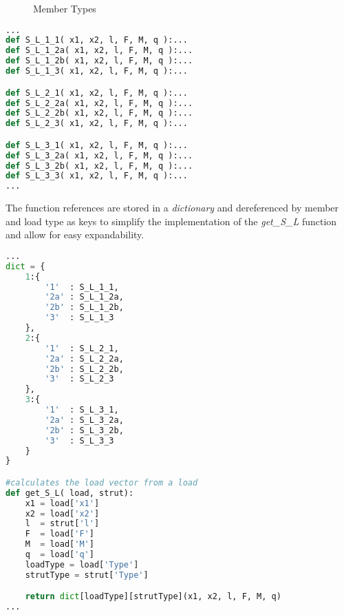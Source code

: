 \begin{figure}[h]%
    \centering
    \qquad

    \centering
    \qquad
    
    \caption{Member Types}%
    \label{fig:memberTypes}%
\end{figure}

\begin{inconsolata}
\begin{lstlisting}[language=python]
...
def S_L_1_1( x1, x2, l, F, M, q ):...
def S_L_1_2a( x1, x2, l, F, M, q ):...
def S_L_1_2b( x1, x2, l, F, M, q ):...
def S_L_1_3( x1, x2, l, F, M, q ):...

def S_L_2_1( x1, x2, l, F, M, q ):...
def S_L_2_2a( x1, x2, l, F, M, q ):...
def S_L_2_2b( x1, x2, l, F, M, q ):...
def S_L_2_3( x1, x2, l, F, M, q ):...

def S_L_3_1( x1, x2, l, F, M, q ):...
def S_L_3_2a( x1, x2, l, F, M, q ):...
def S_L_3_2b( x1, x2, l, F, M, q ):...
def S_L_3_3( x1, x2, l, F, M, q ):...
...
\end{lstlisting}
\end{inconsolata}

The function references are stored in a \textit{dictionary} and dereferenced by member and load type as keys to simplify the implementation of the \textit{get\_S\_L} function and allow for easy expandability.

\begin{inconsolata}
\begin{lstlisting}[language=python]
...
dict = {
    1:{
        '1'  : S_L_1_1,
        '2a' : S_L_1_2a,
        '2b' : S_L_1_2b,
        '3'  : S_L_1_3
    },
    2:{
        '1'  : S_L_2_1,
        '2a' : S_L_2_2a,
        '2b' : S_L_2_2b,
        '3'  : S_L_2_3
    },
    3:{
        '1'  : S_L_3_1,
        '2a' : S_L_3_2a,
        '2b' : S_L_3_2b,
        '3'  : S_L_3_3
    }
}

#calculates the load vector from a load
def get_S_L( load, strut):
    x1 = load['x1']
    x2 = load['x2']
    l  = strut['l']
    F  = load['F']
    M  = load['M']
    q  = load['q']
    loadType = load['Type']
    strutType = strut['Type']

    return dict[loadType][strutType](x1, x2, l, F, M, q)
...
\end{lstlisting}
\end{inconsolata}

